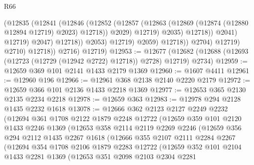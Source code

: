 \begin{lexlean}{R66}
\begin{coremodule}
                                      (@12835
                                        (@12841
                                          (@12846
                                            (@12852
                                              (@12857
                                                (@12863
                                                  (@12869
                                                    (@12874 (@12880 @12894 @12719) @2023)
                                                    @12718))
                                                @2029)
                                              @12719)
                                            @2035)
                                          @12718))
                                      @2041)
                                    @12719)
                                  @2047)
                                @12718))
                            @2053)
                          @12719)
                        @2059)
                      @12718))
                  @2704)
                @12719)
              @2710)
            @12718))
        @2716)
      @12719)
@12953 := @12677
    (@12682 (@12688 (@12693 (@12723 (@12729 (@12942 @2722) @12718)) @2728) @12719) @2734)
@12959 := @12659 @369 @101 @2141 @1433 @2179 @1369
@12960 := @1607 @4411
@12961 := @12960 @196
@12966 := @12961 @368 @2138 @2140 @2220 @2179
@12972 := @12659 @366 @101 @2136 @1433 @2218 @1369
@12977 := @12653 @365 @2130 @2135 @2234 @2218
@12978 := @12659 @363
@12983 := @12978 @294 @2128 @1435 @2232 @1618
@13078 := @12666
    @362
    @2123
    @2127
    @2249
    @2232
    (@12694
      @361
      @1708
      @2122
      @1879
      @2248
      @12722
      (@12659
        @359
        @101
        @2120
        @1433
        @2246
        @1369
        (@12653
          @358
          @2114
          @2119
          @2269
          @2246
          (@12659
            @356
            @294
            @2112
            @1435
            @2267
            @1618
            (@12666
              @355
              @2107
              @2111
              @2284
              @2267
              (@12694
                @354
                @1708
                @2106
                @1879
                @2283
                @12722
                (@12659
                  @352
                  @101
                  @2104
                  @1433
                  @2281
                  @1369
                  (@12653
                    @351
                    @2098
                    @2103
                    @2304
                    @2281

\end{coremodule}
\end{lexlean}
